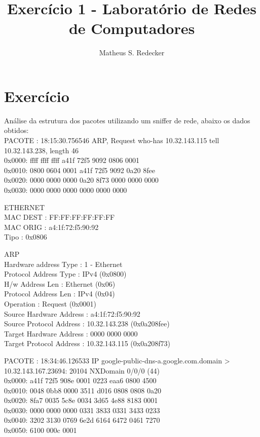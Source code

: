 \documentclass[12pt]{article}
\title{Exercício 1 - Laboratório de Redes de Computadores}
\author{Matheus S. Redecker}
\begin{document}
 

\maketitle

\section{Exercício}

Análise da estrutura dos pacotes utilizando um sniffer de rede, abaixo os dados obtidos:\\ 

PACOTE : 18:15:30.756546 ARP, Request who-has 10.32.143.115 tell 10.32.143.238, length 46 \\
0x0000:  ffff ffff ffff a41f 72f5 9092 0806 0001  \\
0x0010:  0800 0604 0001 a41f 72f5 9092 0a20 8fee  \\
0x0020:  0000 0000 0000 0a20 8f73 0000 0000 0000  \\
0x0030:  0000 0000 0000 0000 0000 0000     

ETHERNET \\
MAC DEST : FF:FF:FF:FF:FF:FF \\
MAC ORIG : a4:1f:72:f5:90:92 \\
Tipo : 0x0806 

ARP \\
Hardware address Type : 1 - Ethernet \\
Protocol Address Type : IPv4 (0x0800) \\
H/w Address Len : Ethernet (0x06) \\
Protocol Address Len : IPv4 (0x04) \\
Operation : Request (0x0001) \\
Source Hardware Address : a4:1f:72:f5:90:92  \\
Source Protocol Address : 10.32.143.238 (0x0a208fee) \\
Target Hardware Address : 0000 0000 0000 \\
Target Protocol Address : 10.32.143.115 (0x0a208f73) 

\newpage
PACOTE : 18:34:46.126533 IP google-public-dns-a.google.com.domain > 10.32.143.167.23694: 20104 NXDomain 0/0/0 (44) \\
0x0000:  a41f 72f5 908e 0001 0223 eaa6 0800 4500  \\
0x0010:  0048 0bb8 0000 3511 d016 0808 0808 0a20   \\
0x0020:  8fa7 0035 5c8e 0034 3d65 4e88 8183 0001   \\
0x0030:  0000 0000 0000 0331 3833 0331 3433 0233   \\
0x0040:  3202 3130 0769 6e2d 6164 6472 0461 7270   \\
0x0050:  6100 000c 0001      
\end{document}
